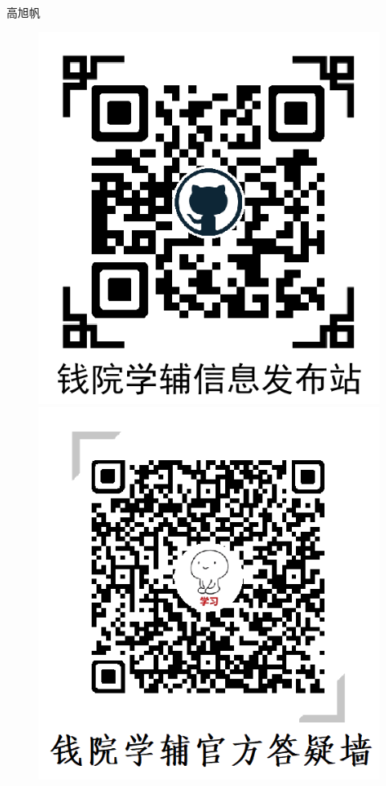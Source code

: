 \documentclass[b5paper,opensource]{./template/qyxf-book}
\begin{document}
\begin{flushright}
	高旭帆
\end{flushright}
\vspace{1.0cm}
\begin{figure}[!h]
	\centering
	\begin{minipage}[c]{0.5\textwidth}
		\centering
		\includegraphics[scale=0.5]{./template/qrcode2.png}
	\end{minipage}%
	\begin{minipage}[c]{0.5\textwidth}
		\centering
		\includegraphics[scale=0.5]{./template/qxf.png}
	\end{minipage}
\end{figure}



\newpage
\tableofcontents
\setlength{\parindent}{0pt}

\newpage

\newpage
\end{document}
